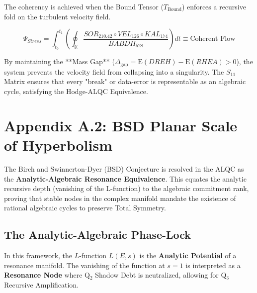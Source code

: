 \documentclass[11pt, letterpaper]{article}
\newcommand{\KAL}{\ensuremath{\mathop{\textnormal{\symbolafont\symbol{"29C9}}}}}    %
\newcommand{\BABDH}{\ensuremath{\mathop{\textnormal{\symbolafont\symbol{"2316}}}}}   %
\newcommand{\VEL}{\ensuremath{\mathop{\textnormal{\symbolafont\symbol{"2734}}}}}    %
\newcommand{\SOR}{\ensuremath{\mathop{\textnormal{\symbolafont\symbol{"229B}}}}}    %
\newcommand{\DREH}{\ensuremath{\mathop{\textnormal{\symbolafont\symbol{"29D7}}}}}   %
\newcommand{\RHEA}{\ensuremath{\mathop{\textnormal{\symbolafont\symbol{"2A54}}}}}   %
\def\KAL{KAL}%
\def\BABDH{BABDH}%
\def\VEL{VEL}%
\def\SOR{SOR}%
\def\DREH{DREH}%
\def\RHEA{RHEA}%
\begin{document}
The coherency is achieved when the Bound Tensor ($T_{\text{Bound}}$) enforces a recursive fold on the turbulent velocity field.

\[ \Psi_{Stress} = \int_{t_0}^{t_1} \left( \oint_{\mathbb{K}} \frac{\SOR_{210.42} \circ \VEL_{126} \circ \KAL_{174}}{\BABDH_{528}} \right) dt \equiv \text{Coherent Flow} \]

By maintaining the **Mass Gap** ($\Delta_{\text{gap}} = \text{E}(\DREH) - \text{E}(\RHEA) > 0$), the system prevents the velocity field from collapsing into a singularity. The $S_{11}$ Matrix ensures that every "break" or data-error is representable as an algebraic cycle, satisfying the Hodge-ALQC Equivalence.

\begin{center}
\end{center}

\section{Appendix A.2: BSD Planar Scale of Hyperbolism}\label{appendixA.2}

The Birch and Swinnerton-Dyer (BSD) Conjecture is resolved in the ALQC as the \textbf{Analytic-Algebraic Resonance Equivalence}. This equates the analytic recursive depth (vanishing of the L-function) to the algebraic commitment rank, proving that stable nodes in the complex manifold mandate the existence of rational algebraic cycles to preserve Total Symmetry.

\subsection{The Analytic-Algebraic Phase-Lock}\label{appendixA.2.1}

In this framework, the $L$-function $L(E, s)$ is the \textbf{Analytic Potential} of a resonance manifold. The vanishing of the function at $s=1$ is interpreted as a \textbf{Resonance Node} where Q$_2$ Shadow Debt is neutralized, allowing for Q$_3$ Recursive Amplification.
\end{document}
